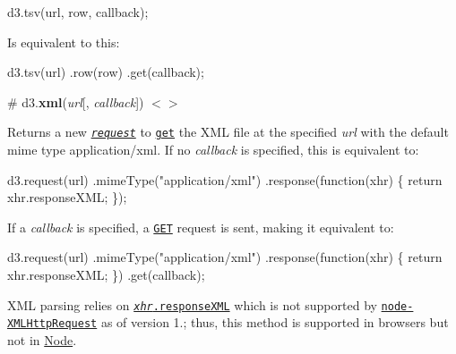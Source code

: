 \begin{DoxyCode}
d3.tsv(url, row, callback);
\end{DoxyCode}


Is equivalent to this\+:


\begin{DoxyCode}
d3.tsv(url)
    .row(row)
    .get(callback);
\end{DoxyCode}


\label{_xml}%
\# d3.{\bfseries xml}({\itshape url}\mbox{[}, {\itshape callback}\mbox{]}) \href{https://github.com/d3/d3-request/blob/master/src/xml.js}{\tt $<$$>$}

Returns a new \href{#request}{\tt {\itshape request}} to \href{#request_get}{\tt get} the X\+ML file at the specified {\itshape url} with the default mime type {\ttfamily application/xml}. If no {\itshape callback} is specified, this is equivalent to\+:


\begin{DoxyCode}
d3.request(url)
    .mimeType("application/xml")
    .response(function(xhr) \{ return xhr.responseXML; \});
\end{DoxyCode}


If a {\itshape callback} is specified, a \href{#request_get}{\tt G\+ET} request is sent, making it equivalent to\+:


\begin{DoxyCode}
d3.request(url)
    .mimeType("application/xml")
    .response(function(xhr) \{ return xhr.responseXML; \})
    .get(callback);
\end{DoxyCode}


X\+ML parsing relies on \href{https://developer.mozilla.org/en-US/docs/Web/API/XMLHttpRequest/responseXML}{\tt {\itshape xhr}.response\+X\+ML} which is not supported by \href{https://github.com/driverdan/node-XMLHttpRequest/issues/8}{\tt node-\/\+X\+M\+L\+Http\+Request} as of version 1.; thus, this method is supported in browsers but not in \mbox{\hyperlink{classNode}{Node}}. 